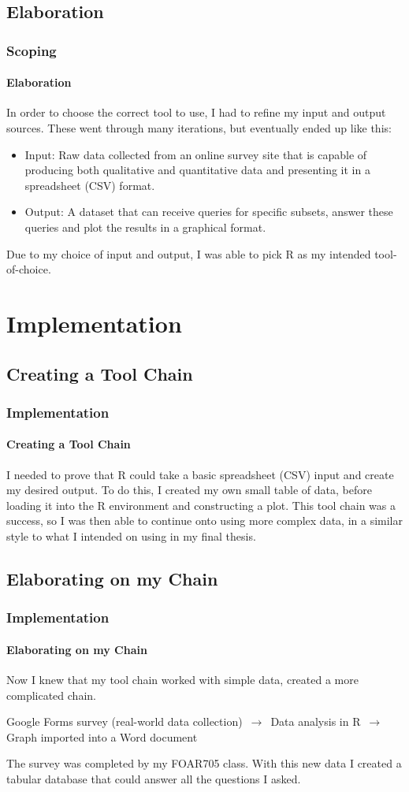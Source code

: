 \documentclass[aspectratio=1610]{beamer}
\begin{document}
\subsection{Elaboration}
\begin{frame}
\frametitle{Scoping}
\framesubtitle{Elaboration}
In order to choose the correct tool to use, I had to refine my input and output sources. These went through many iterations, but eventually ended up like this:
\begin{itemize}
\item Input: Raw data collected from an online survey site that is capable of producing both qualitative and quantitative data and presenting it in a spreadsheet (CSV) format.
\item Output: A dataset that can receive queries for specific subsets, answer these queries and plot the results in a graphical format.
\end{itemize}
Due to my choice of input and output, I was able to pick R as my intended tool-of-choice.
\end{frame}
\section{Implementation}
\subsection{Creating a Tool Chain}
\begin{frame}
\frametitle{Implementation}
\framesubtitle{Creating a Tool Chain}
I needed to prove that R could take a basic spreadsheet (CSV) input and create my desired output. To do this, I created my own small table of data, before loading it into the R environment and constructing a plot.  
\newline
\newline
This tool chain was a success, so I was then able to continue onto using more complex data, in a similar style to what I intended on using in my final thesis.
\end{frame}
\subsection{Elaborating on my Chain}
\begin{frame}
\frametitle{Implementation}
\framesubtitle{Elaborating on my Chain}
Now I knew that my tool chain worked with simple data, created a more complicated chain. 
\begin{center}
Google Forms survey (real-world data collection) 
\newline
$\,\to\,$
Data analysis in R
\newline
$\,\to\,$ 
Graph imported into a Word document
\end{center}
The survey was completed by my FOAR705 class. With this new data I created a tabular database that could answer all the questions I asked.
\end{frame}
\end{document}
